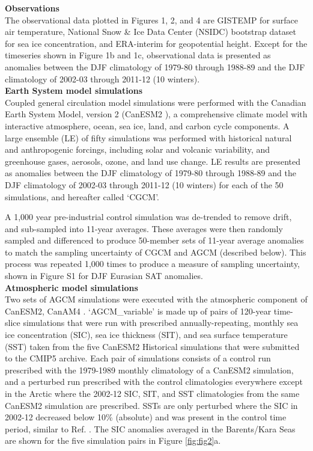 \documentclass{nature}
\begin{document}
\begin{methods}
\textbf{Observations} \\
The observational data plotted in Figures 1, 2, and 4 are GISTEMP \cite{hansen10} for surface air temperature, National Snow \& Ice Data Center (NSIDC) bootstrap dataset \cite{comiso00} for sea ice concentration, and ERA-interim \cite{dee11} for geopotential height. Except for the timeseries shown in Figure 1b and 1c, observational data is presented as anomalies between the DJF climatology of 1979-80 through 1988-89 and the DJF climatology of 2002-03 through 2011-12 (10 winters).
\\
\textbf{Earth System model simulations}\\
Coupled general circulation model simulations were performed with the Canadian Earth System Model, version 2 (CanESM2 \cite{arora11}), a comprehensive climate model with interactive atmosphere, ocean, sea ice, land, and carbon cycle components. A large ensemble (LE) of fifty simulations was performed with historical natural and anthropogenic forcings, including solar and volcanic variability, and greenhouse gases, aerosols, ozone, and land use change. LE results are presented as anomalies between the DJF climatology of 1979-80 through 1988-89 and the DJF climatology of 2002-03 through 2011-12 (10 winters) for each of the 50 simulations, and hereafter called `CGCM'. 

A 1,000 year pre-industrial control simulation was de-trended to remove drift, and sub-sampled into 11-year averages. These averages were then randomly sampled and differenced to produce 50-member sets of 11-year average anomalies to match the sampling uncertainty of CGCM and AGCM (described below). This process was repeated 1,000 times to produce a measure of sampling uncertainty, shown in Figure S1 for DJF Eurasian SAT anomalies.
\\
\textbf{Atmospheric model simulations}\\
Two sets of AGCM simulations were executed with the atmospheric component of CanESM2, CanAM4 \cite{vonsalzen13}. `AGCM\_variable' is made up of pairs of 120-year time-slice simulations that were run with prescribed annually-repeating, monthly sea ice concentration (SIC), sea ice thickness (SIT), and sea surface temperature (SST) taken from the five CanESM2 Historical simulations that were submitted to the CMIP5 archive. Each pair of simulations consists of a control run prescribed with the 1979-1989 monthly climatology of a CanESM2 simulation, and a perturbed run prescribed with the control climatologies everywhere except in the Arctic where the 2002-12 SIC, SIT, and SST climatologies from the same CanESM2 simulation are prescribed. SSTs are only perturbed where the SIC in 2002-12 decreased below 10\% (absolute) and was present in the control time period, similar to Ref. \cite{screen14a}. The SIC anomalies averaged in the Barents/Kara Seas are shown for the five simulation pairs in Figure \ref{fig:fig2}a. %


\end{methods}
\end{document}
